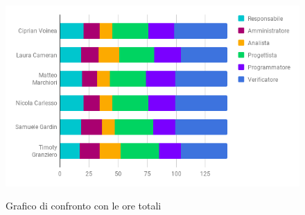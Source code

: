 			\begin{figure}[H]
					\centering
					\includegraphics[scale=0.7]{img/Ore_Totali.png}\\
					\caption{Grafico di confronto con le ore totali}
			\end{figure}
